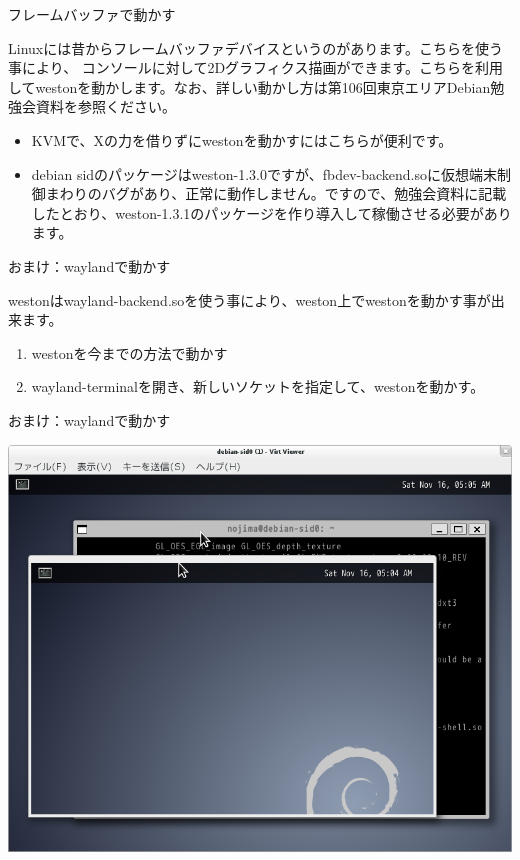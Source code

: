 \begin{frame}{フレームバッファで動かす}

 Linuxには昔からフレームバッファデバイスというのがあります。こちらを使う事により、
コンソールに対して2Dグラフィクス描画ができます。こちらを利用してwestonを動かします。なお、詳しい動かし方は第106回東京エリアDebian勉強会資料を参照ください。

 \begin{itemize}
 \item KVMで、Xの力を借りずにwestonを動かすにはこちらが便利です。
 \item debian sidのパッケージはweston-1.3.0ですが、fbdev-backend.soに仮想端末制御まわりのバグがあり、正常に動作しません。ですので、勉強会資料に記載したとおり、weston-1.3.1のパッケージを作り導入して稼働させる必要があります。
 \end{itemize}

\end{frame}

\begin{frame}[containsverbatim]{おまけ：waylandで動かす}

 westonはwayland-backend.soを使う事により、weston上でwestonを動かす事が出来ます。

 \begin{enumerate}
 \item westonを今までの方法で動かす
 \item wayland-terminalを開き、新しいソケットを指定して、westonを動かす。
 \end{enumerate}


\end{frame}

\begin{frame}{おまけ：waylandで動かす}

\begin{center}
\includegraphics[width=0.8\hsize]{image201311/weston-wayland-launch.png}
\end{center}

\end{frame}


